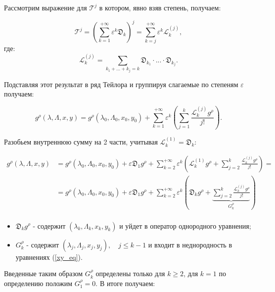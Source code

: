 \begin{enumerate}

Рассмотрим выражение для $\mathcal{T}^j$ в котором, явно взяв степень, получаем:

$$\mathcal{T}^j = \left( \sum_{k=1}^{+\infty} \varepsilon^k \mathfrak{D}_k \right)^j = \sum_{k=j}^{+\infty} \varepsilon^k \mathcal{L}_k^{(j)},$$
где:
$$\mathcal{L}_k^{(j)} = \sum_{k_1+...+k_j = k} \mathfrak{D}_{k_1} \cdot ... \cdot \mathfrak{D}_{k_j}.$$

Подставляя этот результат в ряд Тейлора и группируя слагаемые по степеням $\varepsilon$ получаем:

$$g^\rho(\lambda,\Lambda,x,y) = g^\rho(\lambda_0,\Lambda_0,x_0,y_0) + \sum_{k=1}^{+\infty} \varepsilon^k \left( \sum_{j=1}^k \frac{\mathcal{L}_k^{(j)} g^\rho}{j!} \right).$$


Разобьем внутреннюю сумму на 2 части, учитывая $\mathcal{L}_k^{(1)} = \mathfrak{D}_k$:

\begin{equation*}
\begin{aligned}
g^\rho(\lambda,\Lambda,x,y) 
    &= g^\rho(\lambda_0,\Lambda_0,x_0,y_0) + \varepsilon \mathfrak{D}_1 g^\rho + \sum_{k=2}^{+\infty} \varepsilon^k \left( \mathcal{L}_k^{(1)}g^\rho + \sum_{j=2}^k \frac{\mathcal{L}_k^{(j)} g^\rho}{j!} \right) = \\ 
    &= g^\rho(\lambda_0,\Lambda_0,x_0,y_0) + \varepsilon \mathfrak{D}_1 g^\rho + \sum_{k=2}^{+\infty} \varepsilon^k \left( \mathfrak{D}_k g^\rho + \underbrace{\sum_{j=2}^k \frac{\mathcal{L}_k^{(j)} g^\rho}{j!}}_{G_k^\rho} \right) \\ 
\end{aligned}
\end{equation*}

\begin{itemize}
\item $\mathfrak{D}_k g^\rho$ - содержит $(\lambda_k, \Lambda_k, x_k, y_k)$ и уйдет в оператор однородного уравнения;
\item $G_k^\rho$ - содержит $(\lambda_j, \Lambda_j, x_j, y_j), \quad j \le k-1$ и входит в неднородность в уравнениях (\ref{xy_eq}).
\end{itemize}

Введенные таким образом $G_k^\rho$ определены только для $k \ge 2$, для $k=1$ по определению положим $G_1^\rho = 0$. В итоге получаем:


\end{enumerate}
